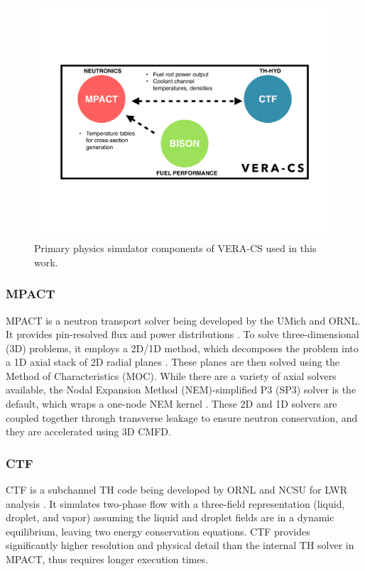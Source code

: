 \documentclass[edeposit,fullpage,11pt]{uiucthesis2009}
\begin{document}
\begin{figure}
\begin{center}
\includegraphics[width=0.75\linewidth,trim={2cm 5cm 2cm 5cm}]{./Figures/VERA-CS-Figure.pdf}
\end{center}
\caption{Primary physics simulator components of VERA-CS used in this work.}
\label{fig:workflow}
\end{figure} 

\subsubsection{MPACT}
MPACT is a neutron transport solver being developed by the \gls{UMich} and \gls{ORNL}. 
It provides pin-resolved flux and power distributions \cite{kochunas_overview_2013}. 
To solve three-dimensional (3D) problems, it employs a 2D/1D method, which decomposes the problem into a 1D axial stack of 2D radial planes \cite{zhu_assessment_2014}. 
These planes are then solved using the Method of Characteristics (MOC). 
While there are a variety of axial solvers available, the Nodal Expansion Method (NEM)-simplified P3 (SP3) solver is the default, which wraps a one-node NEM kernel \cite{stimpson_axial_2014}. 
These 2D and 1D solvers are coupled together through transverse leakage to ensure neutron conservation, and they are accelerated using 3D \gls{CMFD}. 

\subsubsection{CTF}
CTF is a subchannel TH code being developed by \gls{ORNL} and \gls{NCSU} for LWR analysis \cite{avramova_ctf:_2009}. 
It simulates two-phase flow with a three-field representation (liquid, droplet, and vapor) assuming the liquid and droplet fields are in a dynamic equilibrium, leaving two energy conservation equations. 
CTF provides significantly higher resolution and physical detail than the internal TH solver in MPACT, thus requires longer execution times. 
\end{document}
